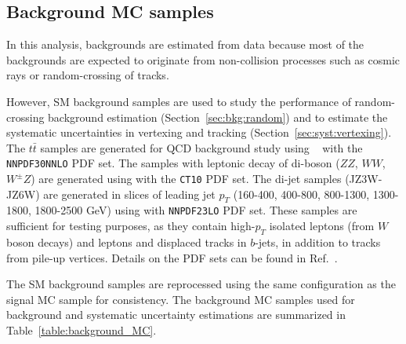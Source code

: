 \subsection{Background MC samples}
\label{sec:background_mc_sample}
In this analysis, backgrounds are estimated from data because most of the backgrounds are expected to originate from non-collision processes such as cosmic rays or random-crossing of tracks. %

However, SM background samples are used to study the performance of random-crossing background estimation (Section~\ref{sec:bkg:random}) and to estimate the systematic uncertainties in vertexing and tracking (Section~\ref{sec:syst:vertexing}). The $t\bar{t}$ samples are generated for QCD background study using ~\cite{Gleisberg:2008ta} with the \texttt{NNPDF30NNLO} PDF set. The samples with leptonic decay of di-boson ($ZZ$, $WW$, $W^{\pm}Z$) are generated using  with the \texttt{CT10} PDF set. The di-jet samples (JZ3W-JZ6W) are generated in slices of leading jet $p_{T}$ (160-400, 400-800, 800-1300, 1300-1800, 1800-2500 GeV) using  with \texttt{NNPDF23LO} PDF set. These samples are sufficient for testing purposes, as they contain high-$p_{T}$ isolated leptons (from $W$ boson decays) and leptons and displaced tracks in $b$-jets, in addition to tracks from pile-up vertices. Details on the PDF sets can be found in Ref.~\cite{Ball:2014uwa}.

The SM background samples are reprocessed using the same configuration as the signal MC sample for consistency. The background MC samples used for background and systematic uncertainty estimations are summarized in Table~\ref{table:background_MC}.


